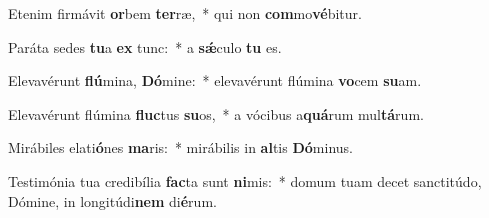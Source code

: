 \item Etenim firmávit \textbf{or}bem \textbf{ter}ræ,~* qui non \textbf{com}mo\textbf{vé}bitur.
\item Paráta sedes \textbf{tu}a \textbf{ex} tunc:~* a \textbf{sǽ}culo \textbf{tu} es.
\item Elevavérunt \textbf{flú}mina, \textbf{Dó}mine:~* elevavérunt flúmina \textbf{vo}cem \textbf{su}am.
\item Elevavérunt flúmina \textbf{fluc}tus \textbf{su}os,~* a vócibus a\textbf{quá}rum mul\textbf{tá}rum.
\item Mirábiles elati\textbf{ó}nes \textbf{ma}ris:~* mirábilis in \textbf{al}tis \textbf{Dó}minus.
\item Testimónia tua credibília \textbf{fac}ta sunt \textbf{ni}mis:~* domum tuam decet sanctitúdo, Dómine, in longitúdi\textbf{nem} di\textbf{é}rum.
